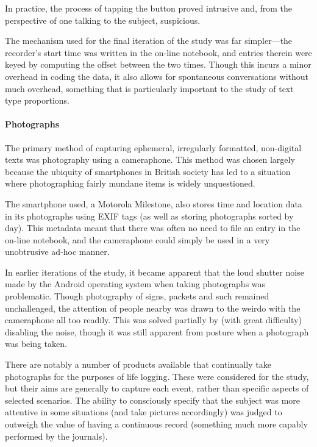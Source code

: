 In practice, the process of tapping the button proved intrusive and, from the perspective of one talking to the subject, suspicious.

The mechanism used for the final iteration of the study was far simpler---the recorder's start time was written in the on-line notebook, and entries therein were keyed by computing the offset between the two times.  Though this incurs a minor overhead in coding the data, it also allows for spontaneous conversations without much overhead, something that is particularly important to the study of text type proportions.



\paragraph{Photographs}
The primary method of capturing ephemeral, irregularly formatted, non-digital texts was photography using a cameraphone.  This method was chosen largely because the ubiquity of smartphones in British society has led to a situation where photographing fairly mundane items is widely unquestioned.

The smartphone used, a Motorola Milestone, also stores time and location data in its photographs using EXIF tags (as well as storing photographs sorted by day).  This metadata meant that there was often no need to file an entry in the on-line notebook, and the cameraphone could simply be used in a very unobtrusive ad-hoc manner.

In earlier iterations of the study, it became apparent that the loud shutter noise made by the Android operating system when taking photographs was problematic.  Though photography of signs, packets and such remained unchallenged, the attention of people nearby was drawn to the weirdo with the cameraphone all too readily.  This was solved partially by (with great difficulty) disabling the noise, though it was still apparent from posture when a photograph was being taken.

There are notably a number of products available that continually take photographs for the purposes of life logging.  These were considered for the study, but their aims are generally to capture each event, rather than specific aspects of selected scenarios.  The ability to consciously specify that the subject was more attentive in some situations (and take pictures accordingly) was judged to outweigh the value of having a continuous record (something much more capably performed by the journals).





